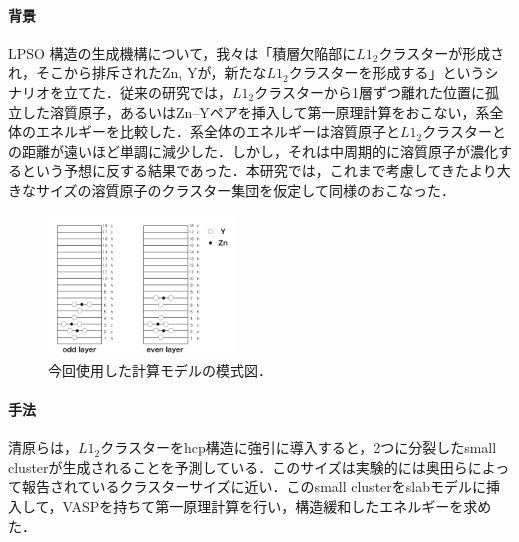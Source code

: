 \documentclass[12pt, a4paper]{jarticle}
\newcommand{\講演番号}
{14pPSA-18}
\newcommand{\講演題目}
{Mg-LPSOのL\mbox{\boldmath $1_2$} クラスターの第一原理計算}
\newcommand{\英文題目}
{First principle calculations of L1$_2$ Cluster in Mg-Zn-Y alloy}
\newcommand{\和文所属}
{関西学院大・理工}
\newcommand{\和文氏名}
{西谷滋人, 清原資之, 森下慎也}
\newcommand{\英文所属}
{Department of Informatics, Kwansei Gakuin Univ}
\newcommand{\英文氏名}
{S. R. Nishitani, M. Kiyohara, and S. Morishita}
\newlength\題目幅
\newlength\ヘッダ項目間隔
\newlength\所属インデント
\newlength\和文氏名インデント
\newlength\英文氏名インデント
\newlength\最小所属氏名間隔
\newlength\ヘッダ行間隔
\newlength\本文行間隔
\newlength\上端余白
\newlength\左端余白
\begin{document}
\setlength\parindent{1zw}\setlength\baselineskip{\本文行間隔}
\vspace*{\本文行間隔}
\vspace{-1.1\baselineskip}

\paragraph{背景}
LPSO 構造の生成機構について，我々は「積層欠陥部に$L1_2$クラスターが形成され，そこから排斥されたZn, Yが，新たな$L1_2$クラスターを形成する」というシナリオを立てた\cite{sakamoto1}．従来の研究では，$L1_2$クラスターから1層ずつ離れた位置に孤立した溶質原子，あるいはZn--Yペアを挿入して第一原理計算をおこない，系全体のエネルギーを比較した．系全体のエネルギーは溶質原子と$L1_2$クラスターとの距離が遠いほど単調に減少した．しかし，それは中周期的に溶質原子が濃化するという予想に反する結果であった．本研究では，これまで考慮してきたより大きなサイズの溶質原子のクラスター集団を仮定して同様のおこなった．


\begin{figure}
\vspace{-2\baselineskip}
\begin{center}
   \includegraphics[width=50mm]{./small_cluster_slab.png}
  \caption{今回使用した計算モデルの模式図．}
  \label{fig:one}
\end{center}
\vspace{-1\baselineskip}
\end{figure}
\vspace{-1\baselineskip}
\paragraph{手法}
清原らは，$L1_2$クラスターをhcp構造に強引に導入すると，2つに分裂したsmall clusterが生成されることを予測している\cite{kiyohara}．このサイズは実験的には奥田らによって報告されているクラスターサイズに近い\cite{okuda}．このsmall clusterをslabモデルに挿入して，VASPを持ちて第一原理計算を行い，構造緩和したエネルギーを求めた．
\end{document}
